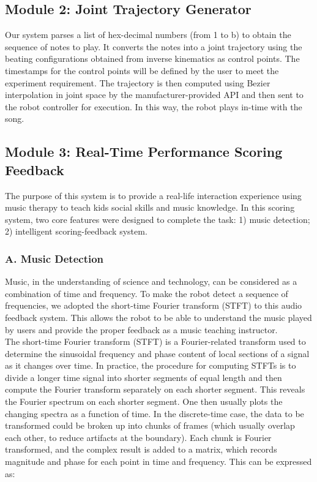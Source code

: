 \subsection{Module 2: Joint Trajectory Generator}
Our system parses a list of hex-decimal numbers (from 1 to b) to obtain the sequence
of notes to play. It converts the notes into a joint trajectory using the beating
configurations obtained from inverse kinematics as control points. The timestamps
for the control points will be defined by the user to meet the experiment requirement.
The trajectory is then computed using Bezier interpolation in joint space by the
manufacturer-provided API and then sent to the robot controller for execution. In this
way, the robot plays in-time with the song.  \\

\subsection{Module 3: Real-Time Performance Scoring Feedback}
The purpose of this system is to provide a real-life interaction experience using 
music therapy to teach kids social skills and music knowledge.  In this scoring 
system, two core features were designed to complete the task: 1) music detection;
2) intelligent scoring-feedback system.\\


\subsubsection{A. Music Detection}
Music, in the understanding of science and technology, can be considered as a combination 
of time and frequency. To make the robot detect a sequence of frequencies, we adopted the 
short-time Fourier transform (STFT) to this audio feedback system. This allows the robot to 
be able to understand the music played by users and provide the proper feedback as
a music teaching instructor.\\

The short-time Fourier transform (STFT) is a Fourier-related transform used to 
determine the sinusoidal frequency and phase content of local sections of a signal 
as it changes over time. In practice, the procedure for computing STFTs is to divide 
a longer time signal into shorter segments of equal length and then compute the 
Fourier transform separately on each shorter segment. This reveals the Fourier 
spectrum on each shorter segment. One then usually plots the changing spectra as 
a function of time. In the discrete-time case, the data to be transformed could 
be broken up into chunks of frames (which usually overlap each other, to reduce 
artifacts at the boundary). Each chunk is Fourier transformed, and the complex 
result is added to a matrix, which records magnitude and phase for each point in 
time and frequency. This can be expressed as:
\\

